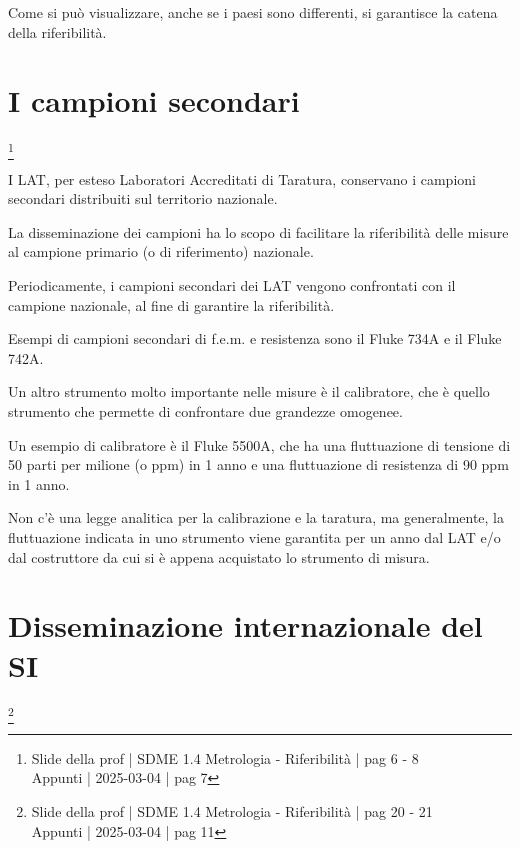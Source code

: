 Come si può visualizzare, anche se i paesi sono differenti, si garantisce la catena della riferibilità. \newline 

\newpage 

\section{I campioni secondari}
\footnote{Slide della prof | SDME 1.4 Metrologia - Riferibilità | pag 6 - 8 \\  
Appunti | 2025-03-04 | pag 7}

I LAT, per esteso Laboratori Accreditati di Taratura, conservano i campioni secondari distribuiti sul territorio nazionale. \newline 

La disseminazione dei campioni ha lo scopo di facilitare la riferibilità delle misure al campione primario 
(o di riferimento) nazionale. \newline 

Periodicamente, i campioni secondari dei LAT vengono confrontati con il campione nazionale, al fine di garantire la riferibilità. \newline 

Esempi di campioni secondari di f.e.m. e resistenza sono il Fluke 734A e il Fluke 742A.  \newline 

Un altro strumento molto importante nelle misure è il calibratore, 
che è quello strumento che permette di confrontare due grandezze omogenee. \newline 

Un esempio di calibratore è il Fluke 5500A, che ha una fluttuazione di tensione di 50 parti per milione (o ppm) in 1 anno e 
una fluttuazione di resistenza di 90 ppm in 1 anno. \newline 

Non c'è una legge analitica per la calibrazione e la taratura, ma generalmente, 
la fluttuazione indicata in uno strumento viene garantita per un anno dal LAT e/o dal costruttore da cui si è appena acquistato lo strumento di misura. \newline 

\newpage 

\section{Disseminazione internazionale del SI}
\footnote{Slide della prof | SDME 1.4 Metrologia - Riferibilità | pag 20 - 21 \\  
Appunti | 2025-03-04 | pag 11}


